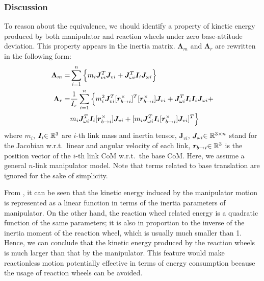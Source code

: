 %

\subsubsection{Discussion}%
\label{sec:DISCUSS}
%
To reason about the equivalence, we should identify a property of kinetic energy 
produced by both manipulator and reaction wheels under zero base-attitude deviation.
This property appears in the inertia matrix.
$\bm{\Lambda}_{m}$ and
$\bm{\Lambda}_{r}$ are rewritten in the following form:
%
\begin{align}
  \bm{\Lambda}_{m} = &\sum_{i=1}^{n}\Big\{m_{i}\bm{J}_{vi}^{T}\bm{J}_{vi} + \bm{J}_{\omega i}^{T}\bm{I}_{i}\bm{J}_{\omega i}\Big\}\label{eq:mani}\\
  \bm{\Lambda}_{r} = &\frac{1}{I_{r}}\sum_{i=1}^{n}\Big\{m_{i}^{2}\bm{J}_{v i}^{T}[\bm{r}_{b \rightarrow i}^{\times}]^{T}[\bm{r}_{b \rightarrow i}^{\times}]\bm{J}_{vi}+
\bm{J}^{T}_{\omega i}\bm{I}_{i}\bm{I}_{i}\bm{J}_{\omega i} +\notag\\
  &m_{i}\bm{J}_{\omega i}^{T}\bm{I}_{i}[\bm{r}_{b \rightarrow i}^{\times}]\bm{J}_{vi} + [ m_{i}\bm{J}_{\omega i}^{T}\bm{I}_{i}[\bm{r}_{b \rightarrow i}^{\times}]\bm{J}_{vi}]^{T}\Big\}\label{eq:rw}
\end{align}
%
where  $m_{i}$, $\bm{I}_{i}{\in\mathbb{R}^{3}}$ are $i$-th link mass and inertia tensor,
$\bm{J}_{vi}$,
$\bm{J}_{\omega i}{\in\mathbb{R}^{3 \times n}}$ stand for the Jacobian w.r.t.\ linear and angular velocity of each link,
$\bm{r}_{b \rightarrow i}{\in\mathbb{R}^{3}}$ is the position vector of the $i$-th link CoM w.r.t.\ the base CoM.
Here, we assume a general $n$-link manipulator model.
Note that terms related to base translation are ignored for the sake of simplicity.

From , it can be seen that the kinetic energy induced by the manipulator motion is represented
as a linear function in terms of the inertia parameters of manipulator.
On the other hand, the
reaction wheel related energy is a quadratic function of the same parameters;
it is also in proportion to the inverse of the inertia moment of the reaction wheel,
which is usually much smaller than 1.
Hence, we can conclude that the  kinetic energy produced by the reaction wheels 
is much larger than that by the manipulator. 
This feature would make reactionless motion potentially effective in terms of energy consumption 
because the usage of reaction wheels can be avoided.

